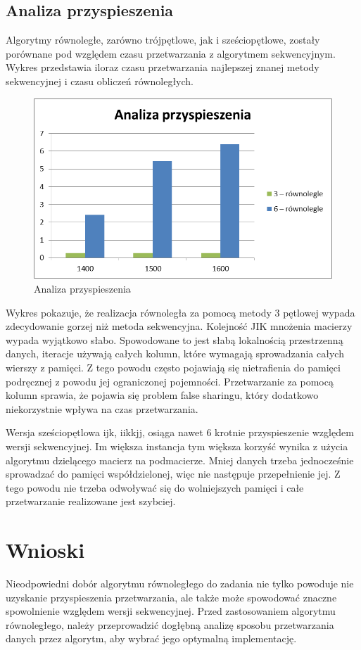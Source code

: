\documentclass{article}
\begin{document}
\subsection{Analiza przyspieszenia}

Algorytmy równoległe, zarówno trójpętlowe, jak i  sześciopętlowe, zostały porównane pod względem czasu przetwarzania z algorytmem sekwencyjnym. Wykres przedstawia iloraz czasu przetwarzania najlepszej znanej metody sekwencyjnej i czasu obliczeń równoległych.

\begin{figure}[H]
	\centering
	\includegraphics[width=\linewidth]{./images/wykresy/analiza_przyspieszenia.png}
	\caption{Analiza przyspieszenia}
	\label{fig:wykres4}
\end{figure}

Wykres pokazuje, że realizacja równoległa za pomocą metody 3 pętlowej wypada zdecydowanie gorzej niż metoda sekwencyjna. Kolejność JIK mnożenia macierzy wypada wyjątkowo słabo. Spowodowane to jest słabą lokalnością przestrzenną danych, iteracje używają całych kolumn, które wymagają sprowadzania całych wierszy z pamięci. Z tego powodu często pojawiają się nietrafienia do pamięci podręcznej z powodu jej ograniczonej pojemności. Przetwarzanie za pomocą kolumn sprawia, że pojawia się problem false sharingu, który dodatkowo niekorzystnie wpływa na czas przetwarzania.

Wersja sześciopętlowa ijk, iikkjj, osiąga nawet 6 krotnie przyspieszenie względem wersji sekwencyjnej. Im większa instancja tym większa korzyść wynika z użycia algorytmu dzielącego macierz na podmacierze. Mniej danych trzeba jednocześnie sprowadzać do pamięci współdzielonej, więc nie następuje przepełnienie jej. Z tego powodu nie trzeba odwoływać się do wolniejszych pamięci i całe przetwarzanie realizowane jest szybciej. 

\section{Wnioski}
Nieodpowiedni dobór algorytmu równoległego do zadania nie tylko powoduje nie uzyskanie przyspieszenia przetwarzania, ale także może spowodować znaczne spowolnienie względem wersji sekwencyjnej. Przed zastosowaniem algorytmu równoległego, należy przeprowadzić dogłębną analizę sposobu przetwarzania danych przez algorytm, aby wybrać jego optymalną implementację.
\end{document}

